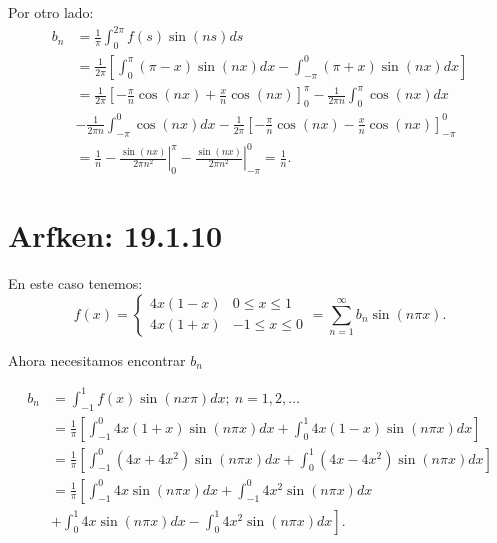 \documentclass{report}
\begin{document}
Por otro lado:
\begin{align*}
  b_n &= \frac{1}{\pi}\int_{0}^{2\pi}f\left( s \right) \sin\left( ns \right) ds \\
  &= \frac{1}{2\pi}\left[ \int_{0}^{\pi} \left( \pi - x \right) \sin\left( nx \right) dx - \int_{-\pi}^{0}\left( \pi + x \right) \sin\left( nx \right) dx \right]  \\
  &= \frac{1}{2\pi}\left[ - \frac{\pi}{n} \cos\left( nx \right) + \frac{x}{n}\cos\left( nx \right)  \right]_{0}^{\pi} - \frac{1}{2\pi n}\int_{0}^{\pi}\cos\left( nx \right) dx \\ 
  &- \frac{1}{2\pi n}\int_{-\pi}^{0} \cos\left( nx \right) dx - \frac{1}{2\pi}\left[ - \frac{\pi}{n}\cos\left( nx \right) - \frac{x}{n}\cos\left( nx \right)  \right]_{-\pi}^{0}\\
  &= \frac{1}{n} - \left. \frac{\sin\left( nx \right) }{2\pi n^2}\right|_{0}^{\pi} - \left. \frac{\sin\left( nx \right) }{2\pi n^2}\right|_{-\pi}^{0} = \frac{1}{n}
.\end{align*}

\chapter{Arfken: 19.1.10}

En este caso tenemos: \[
f\left( x \right) = \begin{cases}
  4x\left( 1 - x \right) & 0 \le x \le 1 \\
  4x(1 + x) & -1 \le x \le 0
\end{cases} = \sum_{n=1}^{\infty} b_n \sin\left( n\pi x \right) 
.\] 

Ahora necesitamos encontrar $b_n$

\begin{align*}
  b_n &= \int_{-1}^{1}f\left( x \right) \sin\left( nx\pi \right) dx;\ n = 1,2,\ldots \\
  &= \frac{1}{\pi}\left[ \int_{-1}^{0} 4x\left( 1 + x \right) \sin\left( n\pi x \right) dx + \int_{0}^{1} 4x\left( 1 - x \right) \sin\left( n\pi x \right) dx \right]  \\
  &= \frac{1}{\pi}\left[ \int_{-1}^{0}\left( 4x + 4x^2 \right) \sin\left( n\pi x \right) dx + \int_{0}^{1}\left( 4x - 4x^2 \right) \sin\left( n\pi x \right) dx \right] \\
  &= \frac{1}{\pi}\left[ \int_{-1}^{0} 4x \sin\left( n\pi x \right) dx + \int_{-1}^{0} 4x^2\sin\left( n\pi x \right) dx \right.\\
  &\left.+\int_{0}^{1} 4x\sin\left( n\pi x \right) dx - \int_{0}^{1} 4x^2 \sin\left( n\pi x \right) dx\right]
.\end{align*}
\end{document}

